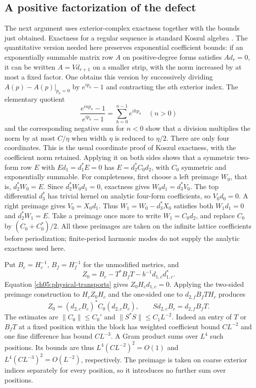 \subsection{A positive factorization of the defect}

The next argument uses exterior-complex exactness together with
the bounds just obtained. Exactness for a regular sequence is
standard Koszul algebra \cite[Lemma 15.31.2]{StacksKoszul}.
The quantitative version needed here preserves exponential
coefficient bounds: if an exponentially summable matrix row
$A$ on positive-degree forms satisfies $Ad_r=0$, it can be
written $A=Vd_{r+1}$ on a smaller strip, with the norm increased by at most a fixed factor.
One obtains this version by successively dividing
$A(p)-A(p)|_{p_a=0}$ by $e^{ip_a}-1$ and contracting the
$a$th exterior index. The elementary quotient
\[
 \frac{e^{inp_a}-1}{e^{ip_a}-1}
   =\sum_{h=0}^{n-1}e^{ihp_a}\quad(n>0)
\]
and the corresponding negative sum for $n<0$ show that a
division multiplies the norm by at most $C/\eta$ when width $\eta$ is reduced
to $\eta/2$. There are only four coordinates. This is the
usual coordinate proof of Koszul exactness, with the coefficient
norm retained. Applying it on both sides shows that a symmetric
two-form row $E$ with $Ed_1=d_1^*E=0$ has
$E=d_2^*C_0d_2$, with $C_0$ symmetric and exponentially summable.
For completeness, first choose a left preimage $W_0$, that is, $d_2^*W_0=E$.
Since $d_2^*W_0d_1=0$, exactness gives
$W_0d_1=d_3^*V_0$. The top differential $d_3^*$ has trivial
kernel on analytic four-form coefficients, so $V_0d_0=0$.
A right preimage gives $V_0=X_0d_1$. Thus
$W_1=W_0-d_3^*X_0$ satisfies both $W_1d_1=0$ and
$d_2^*W_1=E$. Take a preimage once more to write $W_1=C_0d_2$,
and replace $C_0$ by $(C_0+C_0^*)/2$.
All these preimages are taken on the infinite lattice coefficients before
periodization; finite-period harmonic modes do not supply the
analytic exactness used here.

Put $B_c=H_c^{-1}$, $B_f=H_f^{-1}$ for the unmodified metrics,
and
\[
 Z_0=B_c-T^*B_fT-b^{-1}d_{1,c}d_{1,c}^*.
\]
Equation \eqref{ch05:physical-transports} gives
$Z_0H_cd_{1,c}=0$.
Applying the two-sided preimage construction to $H_cZ_0H_c$ and the one-sided
one to $d_{2,f}B_fTH_c$ produces
\begin{equation}
 Z_0=(d_{2,c}B_c)^*C_0(d_{2,c}B_c),\qquad
 Sd_{2,c}B_c=d_{2,f}B_fT.
 \label{ch05:defect-lifts}
\end{equation}
The estimates are
$\|C_0\|\le C_0'$ and $\|S^*S\|\le C_1L^{-2}$.
Indeed an entry of $T$ or $B_fT$ at a fixed position within the block has
weighted coefficient bound $CL^{-2}$ and one fine difference
has bound $CL^{-3}$. A Gram product sums over $L^4$ such positions.
Its bounds are thus $L^4(CL^{-2})^2=O(1)$ and
$L^4(CL^{-3})^2=O(L^{-2})$, respectively.
The preimage is taken on coarse exterior indices separately for every
position, so it introduces no further sum over positions.

